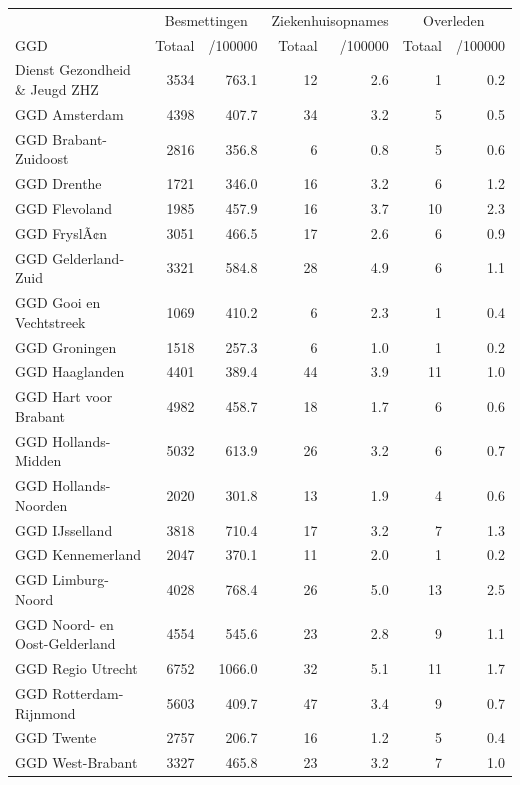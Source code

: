 \documentclass[
  english,
  man,floatsintext]{apa6}
\begin{document}
\begin{table}
\centering\begingroup\fontsize{10}{12}\selectfont

\begin{threeparttable}
\begin{tabular}{lrrrrrr}
\toprule
\multicolumn{1}{c}{ } & \multicolumn{2}{c}{Besmettingen} & \multicolumn{2}{c}{Ziekenhuisopnames} & \multicolumn{2}{c}{Overleden} \\
\cmidrule(l{3pt}r{3pt}){2-3} \cmidrule(l{3pt}r{3pt}){4-5} \cmidrule(l{3pt}r{3pt}){6-7}
GGD & Totaal & /100000 & Totaal & /100000 & Totaal & /100000\\
\midrule
Dienst Gezondheid \& Jeugd ZHZ & 3534 & 763.1 & 12 & 2.6 & 1 & 0.2\\
GGD Amsterdam & 4398 & 407.7 & 34 & 3.2 & 5 & 0.5\\
GGD Brabant-Zuidoost & 2816 & 356.8 & 6 & 0.8 & 5 & 0.6\\
GGD Drenthe & 1721 & 346.0 & 16 & 3.2 & 6 & 1.2\\
GGD Flevoland & 1985 & 457.9 & 16 & 3.7 & 10 & 2.3\\
GGD FryslÃ¢n & 3051 & 466.5 & 17 & 2.6 & 6 & 0.9\\
GGD Gelderland-Zuid & 3321 & 584.8 & 28 & 4.9 & 6 & 1.1\\
GGD Gooi en Vechtstreek & 1069 & 410.2 & 6 & 2.3 & 1 & 0.4\\
GGD Groningen & 1518 & 257.3 & 6 & 1.0 & 1 & 0.2\\
GGD Haaglanden & 4401 & 389.4 & 44 & 3.9 & 11 & 1.0\\
GGD Hart voor Brabant & 4982 & 458.7 & 18 & 1.7 & 6 & 0.6\\
GGD Hollands-Midden & 5032 & 613.9 & 26 & 3.2 & 6 & 0.7\\
GGD Hollands-Noorden & 2020 & 301.8 & 13 & 1.9 & 4 & 0.6\\
GGD IJsselland & 3818 & 710.4 & 17 & 3.2 & 7 & 1.3\\
GGD Kennemerland & 2047 & 370.1 & 11 & 2.0 & 1 & 0.2\\
GGD Limburg-Noord & 4028 & 768.4 & 26 & 5.0 & 13 & 2.5\\
GGD Noord- en Oost-Gelderland & 4554 & 545.6 & 23 & 2.8 & 9 & 1.1\\
GGD Regio Utrecht & 6752 & 1066.0 & 32 & 5.1 & 11 & 1.7\\
GGD Rotterdam-Rijnmond & 5603 & 409.7 & 47 & 3.4 & 9 & 0.7\\
GGD Twente & 2757 & 206.7 & 16 & 1.2 & 5 & 0.4\\
GGD West-Brabant & 3327 & 465.8 & 23 & 3.2 & 7 & 1.0\\

\end{tabular}
\end{threeparttable}
\end{table}
\end{document}
